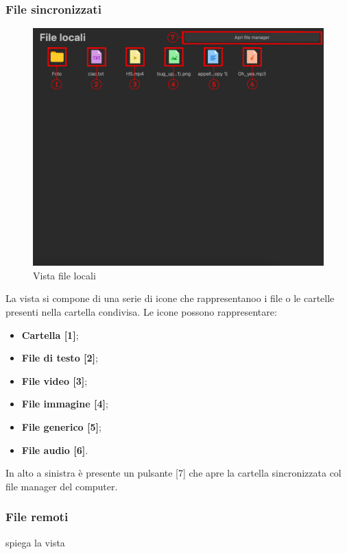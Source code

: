 \subsubsection{File sincronizzati}
\label{sec:fileSincronizzati}

\begin{figure}[H]
    \centering
    \includegraphics[scale = 0.7]{components/img/fileLocali.png}
    \caption{Vista file locali}
    \label{fig:fileSync}
\end{figure}

La vista si compone di una serie di icone che rappresentanoo i file o le cartelle presenti nella cartella condivisa. Le icone possono rappresentare:

\begin{itemize}
\item \textbf{Cartella [1]};\
\item \textbf{File di testo [2]};\
\item \textbf{File video [3]};\
\item \textbf{File immagine [4]};\
\item \textbf{File generico [5]};\
\item \textbf{File audio [6]}.\
\end{itemize}

In alto a sinistra è presente un pulsante [7] che apre la cartella sincronizzata col file manager del computer.



\subsubsection{File remoti}
\label{sec:fileRemoti}
spiega la vista

